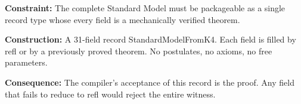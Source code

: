 \documentclass[11pt,a4paper]{book}
\def\texttt#1{#1}%
\begin{document}
\textbf{Constraint:} The complete Standard Model must be packageable as a single record type whose every field is a mechanically verified theorem.

\textbf{Construction:} A 31-field record \texttt{StandardModelFromK4}. Each field is filled by \texttt{refl} or by a previously proved theorem. No postulates, no axioms, no free parameters.

\textbf{Consequence:} The compiler's acceptance of this record is the proof. Any field that fails to reduce to \texttt{refl} would reject the entire witness.

\begin{code}%
\>[0]\<%
\\
%
\\[\AgdaEmptyExtraSkip]%
\>[0]\AgdaSpace{}%
\AgdaSpace{}%
\AgdaSymbol{:}\AgdaSpace{}%
\AgdaSpace{}%
\<%
\\
\>[0][@{}l@{\AgdaIndent{0}}]%
\>[2]\<%
\\
\>[2][@{}l@{\AgdaIndent{0}}]%
\>[4]\<%
\\
%
\>[4]%
\>[21]\AgdaSymbol{:}\AgdaSpace{}%
\AgdaSpace{}%
\AgdaSpace{}%
\<%
\\
%
\>[4]%
\>[21]\AgdaSymbol{:}\AgdaSpace{}%
\AgdaSpace{}%
\AgdaSpace{}%
\<%
\\
%
\>[4]%
\>[21]\AgdaSymbol{:}\AgdaSpace{}%
\AgdaSpace{}%
\AgdaSpace{}%
\<%
\\
%
\\[\AgdaEmptyExtraSkip]%
%
\>[4]\<%
\\
%
\>[4]%
\>[21]\AgdaSymbol{:}\AgdaSpace{}%
\AgdaSpace{}%
\AgdaSpace{}%
\AgdaSpace{}%
\<%
\\
%
\>[4]%
\>[21]\AgdaSymbol{:}\AgdaSpace{}%
\AgdaSpace{}%
\AgdaSpace{}%
\AgdaSpace{}%

\end{code}
\end{document}
